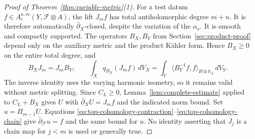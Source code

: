 \documentclass[11pt,reqno]{amsart}
\numberwithin{equation}{section}
\theoremstyle{definition}
\theoremstyle{remark}
\newcommand{\db}{\bar\partial}
\newcommand{\cF}{\mathcal F}
\newcommand{\ip}[2]{\langle #1,#2\rangle}
\begin{document}
\begin{proof}[Proof of Theorem~\ref{thm:variable-metric}(1)]
For a test datum $f\in A_c^{a,m}(Y,\cF\otimes A)$, the lift $J_mf$ has total antiholomorphic degree $m+n$. It is therefore automatically $\db_X$-closed, despite the variation of the $\alpha_\nu$. It is smooth and compactly supported. The operators $B_X,B_Y$ from Section~\ref{sec:product-proof} depend only on the auxiliary metric and the product K\"ahler form. Hence $B_X\geq0$ on the entire total degree, and
\[
 B_XJ_m=J_mB_Y,\qquad
 \int_Xq_{B_X}(J_mf)\,dV_X
    =\int_Y\ip{B_Y^{-1}f}{f}_{H\otimes h_A}\,dV_Y.
\]
The inverse identity uses the varying harmonic isometry, so it remains valid without metric splitting. Since $C_L\geq0$, Lemma~\ref{lem:complete-estimate} applied to $C_L+B_X$ gives $U$ with $\db_XU=J_mf$ and the indicated norm bound. Set $u=\Pi_{m-1}U$. Equations \eqref{eq:top-cohomology-contraction}--\eqref{eq:top-cohomology-chain} give $\db_{\cF}u=f$ and the same bound for $u$. No identity asserting that $J_j$ is a chain map for $j<m$ is used or generally true.
\end{proof}
\end{document}
